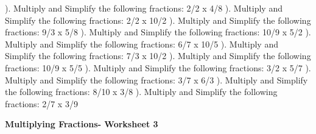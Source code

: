 \documentclass{article}%
\begin{document}
\newline%
\newline%
). Multiply and Simplify the following fractions: 2/2 x 4/8%
\newline%
\newline%
). Multiply and Simplify the following fractions: 2/2 x 10/2%
\newline%
\newline%
). Multiply and Simplify the following fractions: 9/3 x 5/8%
\newline%
\newline%
). Multiply and Simplify the following fractions: 10/9 x 5/2%
\newline%
\newline%
). Multiply and Simplify the following fractions: 6/7 x 10/5%
\newline%
\newline%
). Multiply and Simplify the following fractions: 7/3 x 10/2%
\newline%
\newline%
). Multiply and Simplify the following fractions: 10/9 x 5/5%
\newline%
\newline%
). Multiply and Simplify the following fractions: 3/2 x 5/7%
\newline%
\newline%
). Multiply and Simplify the following fractions: 3/7 x 6/3%
\newline%
\newline%
). Multiply and Simplify the following fractions: 8/10 x 3/8%
\newline%
\newline%
). Multiply and Simplify the following fractions: 2/7 x 3/9%
\newline%
\newline%
\newline%
\pagebreak%
\large%
\begin{center}%
\textbf{Multiplying Fractions- Worksheet 3}%
\newline%
\end{center} \normalsize%
\end{document}
